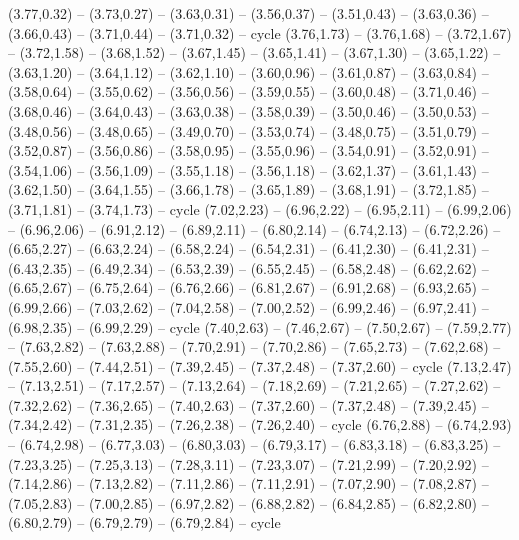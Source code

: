 \expandafter\def\csname geo:gebiet:CHL\endcsname{
  (3.77,0.32) -- (3.73,0.27) -- (3.63,0.31) -- (3.56,0.37) -- (3.51,0.43) -- (3.63,0.36) -- (3.66,0.43) -- (3.71,0.44) -- (3.71,0.32) -- cycle
  (3.76,1.73) -- (3.76,1.68) -- (3.72,1.67) -- (3.72,1.58) -- (3.68,1.52) -- (3.67,1.45) -- (3.65,1.41) -- (3.67,1.30) -- (3.65,1.22) -- (3.63,1.20) -- (3.64,1.12) -- (3.62,1.10) -- (3.60,0.96) -- (3.61,0.87) -- (3.63,0.84) -- (3.58,0.64) -- (3.55,0.62) -- (3.56,0.56) -- (3.59,0.55) -- (3.60,0.48) -- (3.71,0.46) -- (3.68,0.46) -- (3.64,0.43) -- (3.63,0.38) -- (3.58,0.39) -- (3.50,0.46) -- (3.50,0.53) -- (3.48,0.56) -- (3.48,0.65) -- (3.49,0.70) -- (3.53,0.74) -- (3.48,0.75) -- (3.51,0.79) -- (3.52,0.87) -- (3.56,0.86) -- (3.58,0.95) -- (3.55,0.96) -- (3.54,0.91) -- (3.52,0.91) -- (3.54,1.06) -- (3.56,1.09) -- (3.55,1.18) -- (3.56,1.18) -- (3.62,1.37) -- (3.61,1.43) -- (3.62,1.50) -- (3.64,1.55) -- (3.66,1.78) -- (3.65,1.89) -- (3.68,1.91) -- (3.72,1.85) -- (3.71,1.81) -- (3.74,1.73) -- cycle}
\expandafter\def\csname geo:gebiet:COD\endcsname{
  (7.02,2.23) -- (6.96,2.22) -- (6.95,2.11) -- (6.99,2.06) -- (6.96,2.06) -- (6.91,2.12) -- (6.89,2.11) -- (6.80,2.14) -- (6.74,2.13) -- (6.72,2.26) -- (6.65,2.27) -- (6.63,2.24) -- (6.58,2.24) -- (6.54,2.31) -- (6.41,2.30) -- (6.41,2.31) -- (6.43,2.35) -- (6.49,2.34) -- (6.53,2.39) -- (6.55,2.45) -- (6.58,2.48) -- (6.62,2.62) -- (6.65,2.67) -- (6.75,2.64) -- (6.76,2.66) -- (6.81,2.67) -- (6.91,2.68) -- (6.93,2.65) -- (6.99,2.66) -- (7.03,2.62) -- (7.04,2.58) -- (7.00,2.52) -- (6.99,2.46) -- (6.97,2.41) -- (6.98,2.35) -- (6.99,2.29) -- cycle}
\expandafter\def\csname geo:gebiet:SOM\endcsname{
  (7.40,2.63) -- (7.46,2.67) -- (7.50,2.67) -- (7.59,2.77) -- (7.63,2.82) -- (7.63,2.88) -- (7.70,2.91) -- (7.70,2.86) -- (7.65,2.73) -- (7.62,2.68) -- (7.55,2.60) -- (7.44,2.51) -- (7.39,2.45) -- (7.37,2.48) -- (7.37,2.60) -- cycle}
\expandafter\def\csname geo:gebiet:KEN\endcsname{
  (7.13,2.47) -- (7.13,2.51) -- (7.17,2.57) -- (7.13,2.64) -- (7.18,2.69) -- (7.21,2.65) -- (7.27,2.62) -- (7.32,2.62) -- (7.36,2.65) -- (7.40,2.63) -- (7.37,2.60) -- (7.37,2.48) -- (7.39,2.45) -- (7.34,2.42) -- (7.31,2.35) -- (7.26,2.38) -- (7.26,2.40) -- cycle}
\expandafter\def\csname geo:gebiet:SDN\endcsname{
  (6.76,2.88) -- (6.74,2.93) -- (6.74,2.98) -- (6.77,3.03) -- (6.80,3.03) -- (6.79,3.17) -- (6.83,3.18) -- (6.83,3.25) -- (7.23,3.25) -- (7.25,3.13) -- (7.28,3.11) -- (7.23,3.07) -- (7.21,2.99) -- (7.20,2.92) -- (7.14,2.86) -- (7.13,2.82) -- (7.11,2.86) -- (7.11,2.91) -- (7.07,2.90) -- (7.08,2.87) -- (7.05,2.83) -- (7.00,2.85) -- (6.97,2.82) -- (6.88,2.82) -- (6.84,2.85) -- (6.82,2.80) -- (6.80,2.79) -- (6.79,2.79) -- (6.79,2.84) -- cycle}
